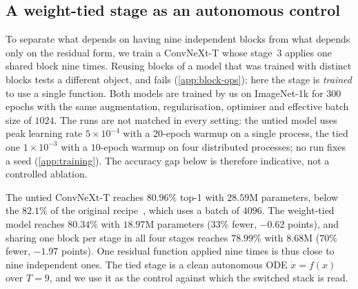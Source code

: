 \subsection{A weight-tied stage as an autonomous control}
\label{sec:weight_tied}

To separate what depends on having nine independent blocks from what depends only on
the residual form, we train a ConvNeXt-T whose stage~3 applies one shared block nine
times.
Reusing blocks of a model that was trained with distinct blocks tests a different
object, and fails (\cref{app:block-ops}); here the stage is \emph{trained} to use a
single function.
Both models are trained by us on ImageNet-1k for $300$ epochs with the same
augmentation, regularisation, optimiser and effective batch size of $1024$.
The runs are not matched in every setting: the untied model uses peak learning rate
$5{\times}10^{-4}$ with a $20$-epoch warmup on a single process, the tied one
$1{\times}10^{-3}$ with a $10$-epoch warmup on four distributed processes; no run
fixes a seed (\cref{app:training}).
The accuracy gap below is therefore indicative, not a controlled ablation.

The untied ConvNeXt-T reaches $80.96\%$ top-1 with $28.59$M parameters, below the
$82.1\%$ of the original recipe~\citep{liu2022convnext}, which uses a batch of $4096$.
The weight-tied model reaches $80.34\%$ with $18.97$M parameters ($33\%$ fewer,
$-0.62$ points), and sharing one block per stage in all four stages reaches $78.99\%$
with $8.68$M ($70\%$ fewer, $-1.97$ points).
One residual function applied nine times is thus close to nine independent ones.
The tied stage is a clean autonomous ODE $\dot x=f(x)$ over $T{=}9$, and we use it as
the control against which the switched stack is read.
